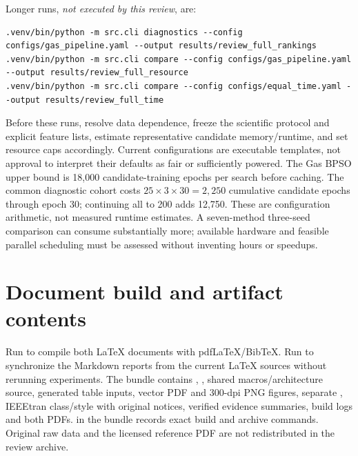 \documentclass[11pt,a4paper]{report}
\begin{document}
Longer runs, \emph{not executed by this review}, are:
\begin{lstlisting}
.venv/bin/python -m src.cli diagnostics --config configs/gas_pipeline.yaml --output results/review_full_rankings
.venv/bin/python -m src.cli compare --config configs/gas_pipeline.yaml --output results/review_full_resource
.venv/bin/python -m src.cli compare --config configs/equal_time.yaml --output results/review_full_time
\end{lstlisting}
Before these runs, resolve data dependence, freeze the scientific protocol and explicit feature lists, estimate representative candidate memory/runtime, and set resource caps accordingly. Current configurations are executable templates, not approval to interpret their defaults as fair or sufficiently powered. The Gas BPSO upper bound is 18,000 candidate-training epochs per search before caching. The common diagnostic cohort costs $25\times3\times30=2,250$ cumulative candidate epochs through epoch 30; continuing all to 200 adds 12,750. These are configuration arithmetic, not measured runtime estimates. A seven-method three-seed comparison can consume substantially more; available hardware and feasible parallel scheduling must be assessed without inventing hours or speedups.

\section{Document build and artifact contents}
Run  to compile both LaTeX documents with pdfLaTeX/BibTeX. Run  to synchronize the Markdown reports from the current LaTeX sources without rerunning experiments. The bundle contains , , shared macros/architecture source, generated table inputs, vector PDF and 300-dpi PNG figures, separate , IEEEtran class/style with original notices, verified evidence summaries, build logs and both PDFs.  in the bundle records exact build and archive commands. Original raw data and the licensed reference PDF are not redistributed in the review archive.

\begingroup
\small
\setlength{\itemsep}{2pt}


\endgroup
\end{document}
